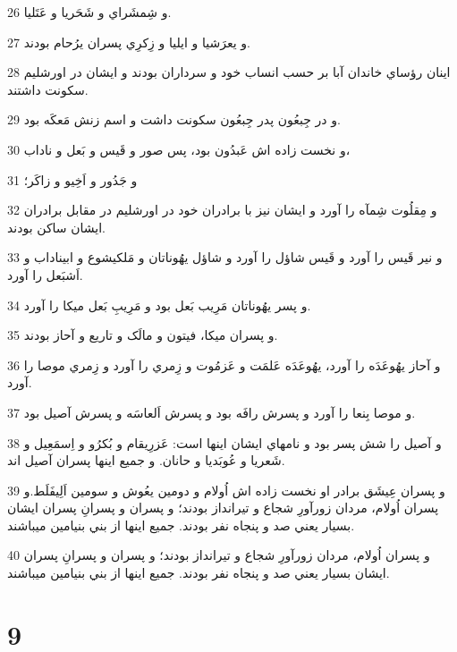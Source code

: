 \par 26 و شِمشَراي و شَحَريا و عَتَليا.
\par 27 و يعرَشيا و ايليا و زِکرِي پسران يرُحام بودند.
\par 28 اينان رؤساي خاندان آبا بر حسب انساب خود و سرداران بودند و ايشان در اورشليم سکونت داشتند.
\par 29 و در جِبعُون پدر جِبعُون سکونت داشت و اسم زنش مَعکَه بود.
\par 30 و نخست زاده اش عَبدُون بود، پس صور و قَيس و بَعل و ناداب،
\par 31 و جَدُور و اَخِيو و زاکَر؛
\par 32 و مِقلُوت شِمآه را آورد و ايشان نيز با برادران خود در اورشليم در مقابل برادران ايشان ساکن بودند.
\par 33 و نير قَيس را آورد و قَيس شاؤل را آورد و شاؤل يهُوناتان و مَلکيشوع و ابيناداب و اَشبَعل را آورد.
\par 34 و پسر يهُوناتان مَرِيب بَعل بود و مَرِيبِ بَعل ميکا را آورد.
\par 35 و پسران ميکا، فيتون و مالَک و تاريع و آحاز بودند.
\par 36 و آحاز يهُوعَدَه را آورد، يهُوعَدَه عَلمَت و عَزمُوت و زِمري را آورد و زِمري موصا را آورد.
\par 37 و موصا بِنعا را آورد و پسرش رافَه بود و پسرش اَلعاسَه و پسرش آصيل بود. 
\par 38 و آصيل را شش پسر بود و نامهاي ايشان اينها است: عَزرِيقام و بُکرُو و اِسمَعِيل و شَعريا و عُوبَديا و حانان. و جميع اينها پسران آصيل اند.
\par 39 و پسران عِيشَق برادر او نخست زاده اش اُولام و دومين يعُوش و سومين اَلِيفَلَط.و پسران اُولام، مردان زورآورِ شجاع و تيرانداز بودند؛ و پسران و پسرانِ پسران ايشان بسيار يعني صد و پنجاه نفر بودند. جميع اينها از بني بنيامين ميباشند.
\par 40 و پسران اُولام، مردان زورآورِ شجاع و تيرانداز بودند؛ و پسران و پسرانِ پسران ايشان بسيار يعني صد و پنجاه نفر بودند. جميع اينها از بني بنيامين ميباشند.
 
\chapter{9}

